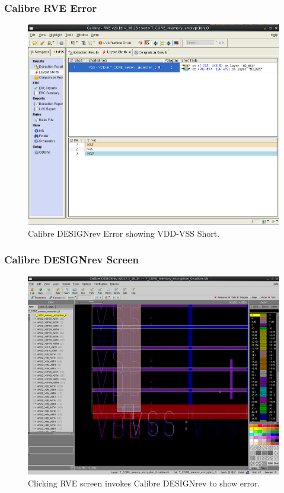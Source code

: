 \documentclass{beamer}
\begin{document}
\begin{frame}
\frametitle{Calibre RVE Error}
\begin{center}
\begin{figure}
	\vspace{-0.1in}
\includegraphics[scale=0.2]{Fig/lvs2-4.png} 
\vspace{-0.1in}
\caption{Calibre DESIGNrev Error showing VDD-VSS Short.}
\end{figure}
\end{center}
\end{frame}
\begin{frame}
\frametitle{Calibre DESIGNrev Screen}
\begin{center}
\begin{figure}
	\vspace{-0.1in}
\includegraphics[scale=0.2]{Fig/lvs2-6.png} 
\vspace{-0.1in}
\caption{Clicking RVE screen invokes Calibre DESIGNrev to show error.}
\end{figure}
\end{center}
\end{frame}
\end{document}
